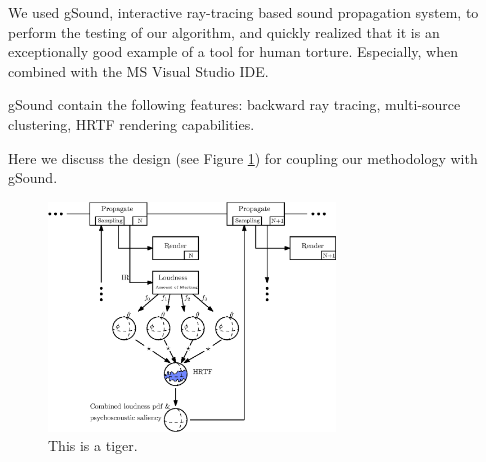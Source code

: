 We used gSound, interactive ray-tracing based sound propagation system, to perform the testing of our algorithm, and quickly realized that it is an exceptionally good example of a tool for human torture. Especially, when combined with the MS Visual Studio IDE. 

gSound \cite{schissler2011gsound} contain the following features: backward ray tracing, multi-source clustering, HRTF rendering capabilities.

Here we discuss the design (see Figure \ref{fig:figure1}) for coupling our methodology with gSound.

\begin{figure}
  \centerline{\includegraphics[width=3.0in]{figs/figure1}}
  \caption{This is a tiger.}
  \label{fig:figure1}
\end{figure}
